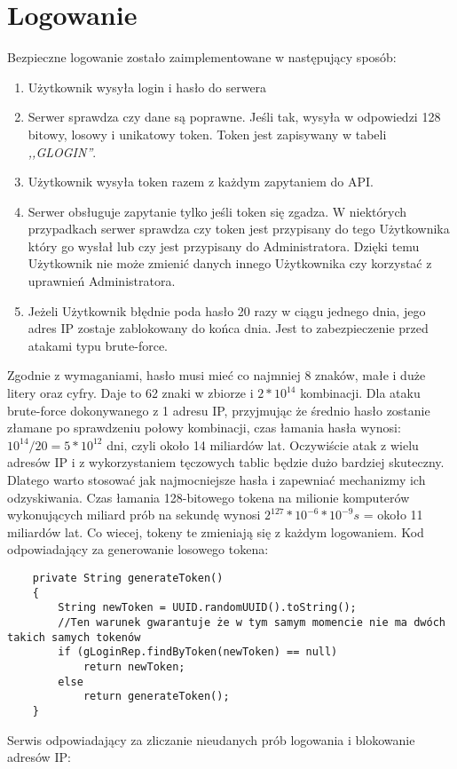 \documentclass[a4paper,12pt,twoside,openany]{report}
\begin{document}
\section{Logowanie}
Bezpieczne logowanie zostało zaimplementowane w następujący sposób:
\begin{enumerate}
	\item Użytkownik wysyła login i hasło do serwera
	\item Serwer sprawdza czy dane są poprawne. Jeśli tak, wysyła w odpowiedzi 128 bitowy, losowy i unikatowy token. Token jest zapisywany w tabeli \textit{,,GLOGIN''}.
	\item Użytkownik wysyła token razem z każdym zapytaniem do API.
	\item Serwer obsługuje zapytanie tylko jeśli token się zgadza. W niektórych przypadkach serwer sprawdza czy token jest przypisany do tego Użytkownika który go wysłał lub czy jest przypisany do Administratora. Dzięki temu Użytkownik nie może zmienić danych innego Użytkownika czy korzystać z uprawnień Administratora.
	\item Jeżeli Użytkownik błędnie poda hasło 20 razy w ciągu jednego dnia, jego adres IP zostaje zablokowany do końca dnia. Jest to zabezpieczenie przed atakami typu brute-force.
\end{enumerate}
Zgodnie z wymaganiami, hasło musi mieć co najmniej 8 znaków, małe i duże litery oraz cyfry. Daje to 62 znaki w zbiorze i $2*10^{14}$ kombinacji. Dla ataku brute-force dokonywanego z 1 adresu IP, przyjmując że średnio hasło zostanie złamane po sprawdzeniu połowy kombinacji, czas łamania hasła wynosi:  $10^{14}/20=5*10^{12}$ dni, czyli około 14 miliardów lat. Oczywiście atak z wielu adresów IP i z wykorzystaniem tęczowych tablic będzie dużo bardziej skuteczny. Dlatego warto stosować jak najmocniejsze hasła i zapewniać mechanizmy ich odzyskiwania. Czas łamania 128-bitowego tokena na milionie komputerów wykonujących miliard prób na sekundę wynosi $2^{127}*10^{-6}*10^{-9}s$ = około 11 miliardów lat. Co wiecej, tokeny te zmieniają się z każdym logowaniem.
Kod odpowiadający za generowanie losowego tokena:
\begin{lstlisting}
    private String generateToken()
    {
        String newToken = UUID.randomUUID().toString();
        //Ten warunek gwarantuje że w tym samym momencie nie ma dwóch takich samych tokenów
        if (gLoginRep.findByToken(newToken) == null)
            return newToken;
        else
            return generateToken();
    }
\end{lstlisting}
Serwis odpowiadający za zliczanie nieudanych prób logowania i blokowanie adresów IP:
\end{document}
